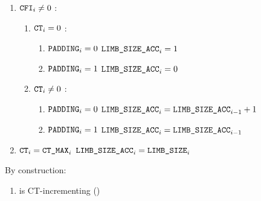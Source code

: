 \begin{enumerate}
	\item \If $\texttt{CFI}_{i} \ne 0$ \Then:
	\begin{enumerate}
		\item \If $\texttt{CT}_{i}=0$ \Then:
		\begin{enumerate}
		 	\item \If $\texttt{PADDING}_{i}=0$ \Then $\texttt{LIMB\_SIZE\_ACC}_{i}=1$
		 	\item \If $\texttt{PADDING}_{i}=1$ \Then $\texttt{LIMB\_SIZE\_ACC}_{i}=0$ 
		\end{enumerate}
		\item \If $\texttt{CT}_{i} \neq 0$ \Then:
		\begin{enumerate}
		 	\item \If $\texttt{PADDING}_{i}=0$ \Then $\texttt{LIMB\_SIZE\_ACC}_{i}=\texttt{LIMB\_SIZE\_ACC}_{i-1}+1$
		 	\item \If $\texttt{PADDING}_{i}=1$ \Then $\texttt{LIMB\_SIZE\_ACC}_{i}=\texttt{LIMB\_SIZE\_ACC}_{i-1}$ 
		\end{enumerate} 
	\end{enumerate}
	\item \If $\texttt{CT}_{i}=\texttt{CT\_MAX}_{i}$ \Then $\texttt{LIMB\_SIZE\_ACC}_{i}=\texttt{LIMB\_SIZE}_{i}$
\end{enumerate}

\saNote{} By construction:
\begin{enumerate}[resume]
	\item \romColumnLimbByteSizeAcc{} is CT-incrementing \quad (\trash) 
\end{enumerate}
